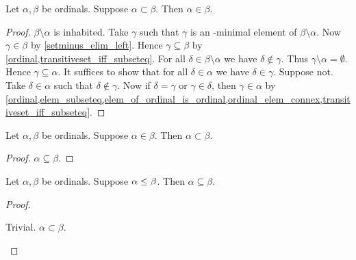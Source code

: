 \begin{proposition}\label{ordinal_proper_subset_implies_elem}
    Let $\alpha,\beta$ be ordinals.
    Suppose $\alpha\subset\beta$.
    Then $\alpha\in\beta$.
\end{proposition}
\begin{proof}
    $\beta\setminus\alpha$ is inhabited.
    Take $\gamma$ such that $\gamma$ is an \in-minimal element of $\beta\setminus\alpha$.
    Now $\gamma\in\beta$ by \cref{setminus_elim_left}.
    Hence $\gamma\subseteq\beta$
        by \cref{ordinal,transitiveset_iff_subseteq}.
    For all $\delta\in\beta\setminus\alpha$ we have $\delta\notin\gamma$.
    Thus $\gamma\setminus\alpha = \emptyset$.
    Hence $\gamma\subseteq\alpha$.
    It suffices to show that for all $\delta\in\alpha$ we have $\delta\in\gamma$.
        Suppose not.
        Take $\delta\in\alpha$ such that $\delta\notin\gamma$.
        Now if $\delta = \gamma$ or $\gamma\in\delta$, then $\gamma\in\alpha$
            by \cref{ordinal,elem_subseteq,elem_of_ordinal_is_ordinal,ordinal_elem_connex,transitiveset_iff_subseteq}.
\end{proof}

\begin{proposition}\label{ordinal_elem_implies_proper_subset}
    Let $\alpha,\beta$ be ordinals.
    Suppose $\alpha\in\beta$.
    Then $\alpha\subset\beta$.
\end{proposition}
\begin{proof}
    $\alpha\subseteq\beta$.
\end{proof}

\begin{proposition}\label{ordinal_preceq_implies_subseteq}
Let $\alpha,\beta$ be ordinals.
Suppose $\alpha\leq\beta$.
Then $\alpha\subseteq\beta$.
\end{proposition}
\begin{proof}
    \begin{byCase}
            Trivial.
            $\alpha\subset\beta$.
    \end{byCase}
\end{proof}



